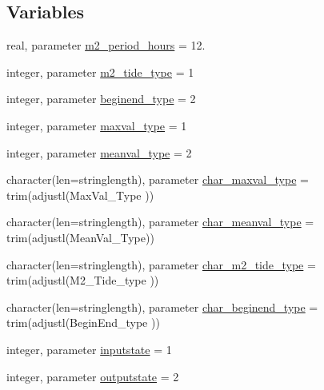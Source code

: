 \subsection*{Variables}
\begin{DoxyCompactItemize}
\item 
real, parameter \mbox{\hyperlink{namespacemodulehydrodynamicfile_ae01cf90e643c22027a057b444138753b}{m2\+\_\+period\+\_\+hours}} = 12.
\item 
integer, parameter \mbox{\hyperlink{namespacemodulehydrodynamicfile_a34497a0e115516f18a0e5835e6072fdb}{m2\+\_\+tide\+\_\+type}} = 1
\item 
integer, parameter \mbox{\hyperlink{namespacemodulehydrodynamicfile_a54c91753549bee1b5964361ce467d536}{beginend\+\_\+type}} = 2
\item 
integer, parameter \mbox{\hyperlink{namespacemodulehydrodynamicfile_a37f925874c5f4013567b353d89ce110d}{maxval\+\_\+type}} = 1
\item 
integer, parameter \mbox{\hyperlink{namespacemodulehydrodynamicfile_a9116232af616dc414e2af54862c61ea5}{meanval\+\_\+type}} = 2
\item 
character(len=stringlength), parameter \mbox{\hyperlink{namespacemodulehydrodynamicfile_af357c98f7d7ca01c0c68275368f80edb}{char\+\_\+maxval\+\_\+type}} = trim(adjustl(\textquotesingle{}Max\+Val\+\_\+\+Type\textquotesingle{} ))
\item 
character(len=stringlength), parameter \mbox{\hyperlink{namespacemodulehydrodynamicfile_ab74c3b9dea734eb31f28429eab24ea51}{char\+\_\+meanval\+\_\+type}} = trim(adjustl(\textquotesingle{}Mean\+Val\+\_\+\+Type\textquotesingle{}))
\item 
character(len=stringlength), parameter \mbox{\hyperlink{namespacemodulehydrodynamicfile_a861e2e3a8faba8b37911851568417e41}{char\+\_\+m2\+\_\+tide\+\_\+type}} = trim(adjustl(\textquotesingle{}M2\+\_\+\+Tide\+\_\+type\textquotesingle{} ))
\item 
character(len=stringlength), parameter \mbox{\hyperlink{namespacemodulehydrodynamicfile_a50d35586cf8d8931655ba77b057633f7}{char\+\_\+beginend\+\_\+type}} = trim(adjustl(\textquotesingle{}Begin\+End\+\_\+type\textquotesingle{} ))
\item 
integer, parameter \mbox{\hyperlink{namespacemodulehydrodynamicfile_a5ad2570e6e662bc5c287fbfba9d01d66}{inputstate}} = 1
\item 
integer, parameter \mbox{\hyperlink{namespacemodulehydrodynamicfile_abe4ae37433a4315c9986ad89795f175d}{outputstate}} = 2
\item 

\end{DoxyCompactItemize}
